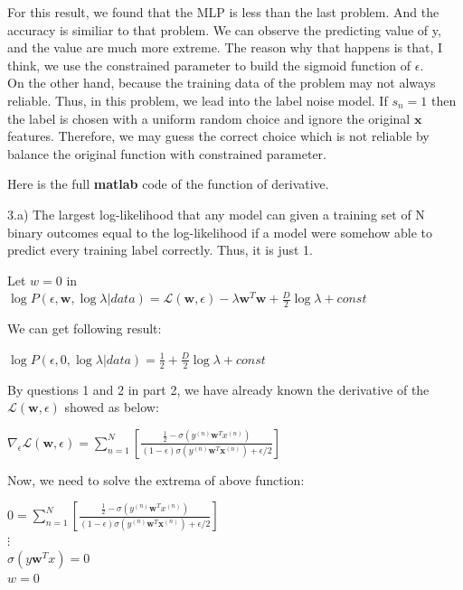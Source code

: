 \documentclass{article}
\begin{document}
For this result, we found that the MLP is less than the last problem. And the accuracy is similiar to that problem. We can observe the predicting value of y,
and the value are much more extreme. The reason why that happens is that, I think, we use the constrained parameter to build the sigmoid function of $\epsilon$.\\
On the other hand, because the training data of the problem may not always reliable. Thus, in this problem, we lead into the label noise model. If $s_{n} = 1$ then the
label is chosen with a uniform random choice and ignore the original $\textbf{x}$ features. Therefore, we may guess the correct choice which is not reliable by balance the 
original function with constrained parameter.

Here is the full \textbf{matlab} code of the function of derivative.



3.a) The largest log-likelihood that any model can given a training set of N binary outcomes equal to the log-likelihood if a model were somehow able to predict every
training label correctly. Thus, it is just 1.

\begin{center}
    Let $w = 0$ in\\
    $\log P(\epsilon,\textbf{w},\log \lambda | data) = \mathcal{L}(\textbf{w},\epsilon) - \lambda \textbf{w}^{T}\textbf{w} + \frac{D}{2}\log \lambda + const$ 
\end{center}

We can get following result:

\begin{center}
    $\log P(\epsilon,0,\log \lambda | data) = \frac{1}{2} + \frac{D}{2}\log \lambda + const$
\end{center}

By questions 1 and 2 in part 2, we have already known the derivative of the $\mathcal{L}(\textbf{w},\epsilon)$ showed as below:

\begin{center}
    $\nabla_{\epsilon}\mathcal{L}(\textbf{w},\epsilon) = \sum\limits_{n=1}^N \left[ \frac{\frac{1}{2}-\sigma(y^{(n)}\textbf{w}^{T}x^{(n)})}{(1-\epsilon)\sigma(y^{(n)}\textbf{w}^{T}\textbf{x}^{(n)})+\epsilon /2}\right]$
\end{center}

Now, we need to solve the extrema of above function:

\begin{center}
    $0 = \sum\limits_{n=1}^N \left[ \frac{\frac{1}{2}-\sigma(y^{(n)}\textbf{w}^{T}x^{(n)})}{(1-\epsilon)\sigma(y^{(n)}\textbf{w}^{T}\textbf{x}^{(n)})+\epsilon /2}\right]$\\
    $\vdots$ \\
    $\sigma(y\textbf{w}^{T}x) = 0$ \\
    $w = 0$
\end{center}
\end{document}
